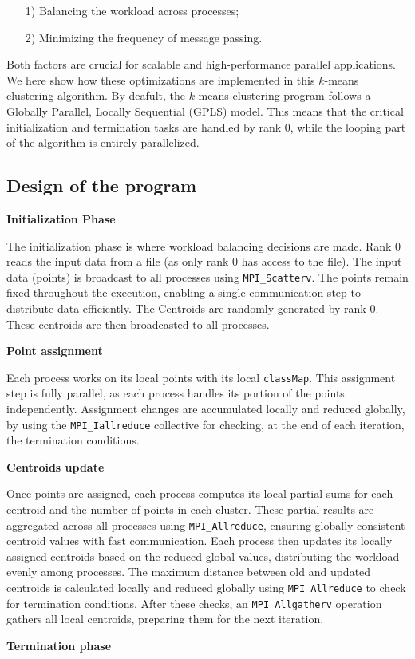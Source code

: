 \documentclass[11pt, journal]{IEEEtran}
\newcommand{\nwl}{

\vspace{11pt}

}
\begin{document}
\begin{itemize}
    \item [1)] Balancing the workload across processes;
    \item [2)] Minimizing the frequency of message passing.
\end{itemize}
\nwl
Both factors are crucial for scalable and high-performance parallel applications. We here show how these optimizations are implemented in this $k$-means clustering algorithm. By deafult, the $k$-means clustering program follows a Globally Parallel, Locally Sequential (GPLS) model. This means that the critical initialization and termination tasks are handled by rank 0, while the looping part of the algorithm is entirely parallelized. 

\subsection{Design of the program}

\noindent \textbf{Initialization Phase}

The initialization phase is where workload balancing decisions are made. Rank 0 reads the input data from a file (as only rank 0 has access to the file). The input data (points) is broadcast to all processes using \texttt{MPI\_Scatterv}. The points remain fixed throughout the execution, enabling a single communication step to distribute data efficiently. The Centroids are randomly generated by rank 0. These centroids are then broadcasted to all processes.
\nwl
\noindent \textbf{Point assignment}

Each process works on its local points with its local \texttt{classMap}. This assignment step is fully parallel, as each process handles its portion of the points independently. Assignment changes are accumulated locally and reduced globally, by using the \texttt{MPI\_Iallreduce} collective for checking, at the end of each iteration, the termination conditions.
\nwl
\noindent \textbf{Centroids update}

Once points are assigned, each process computes its local partial sums for each centroid and the number of points in each cluster. These partial results are aggregated across all processes using \texttt{MPI\_Allreduce}, ensuring globally consistent centroid values with fast communication. Each process then updates its locally assigned centroids based on the reduced global values, distributing the workload evenly among processes. The maximum distance between old and updated centroids is calculated locally and reduced globally using \texttt{MPI\_Allreduce} to check for termination conditions. After these checks, an \texttt{MPI\_Allgatherv} operation gathers all local
centroids, preparing them for the next iteration.
\nwl
\noindent \textbf{Termination phase}
\end{document}
